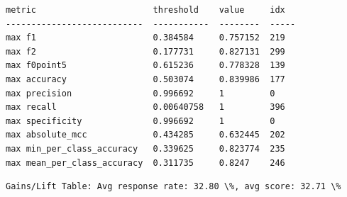 \documentclass[11pt]{article}
\begin{document}
    
    \begin{verbatim}
metric                       threshold    value     idx
---------------------------  -----------  --------  -----
max f1                       0.384584     0.757152  219
max f2                       0.177731     0.827131  299
max f0point5                 0.615236     0.778328  139
max accuracy                 0.503074     0.839986  177
max precision                0.996692     1         0
max recall                   0.00640758   1         396
max specificity              0.996692     1         0
max absolute_mcc             0.434285     0.632445  202
max min_per_class_accuracy   0.339625     0.823774  235
max mean_per_class_accuracy  0.311735     0.8247    246
    \end{verbatim}

    
    \begin{Verbatim}[commandchars=\\\{\}]
Gains/Lift Table: Avg response rate: 32.80 \%, avg score: 32.71 \%


    \end{Verbatim}
\end{document}
